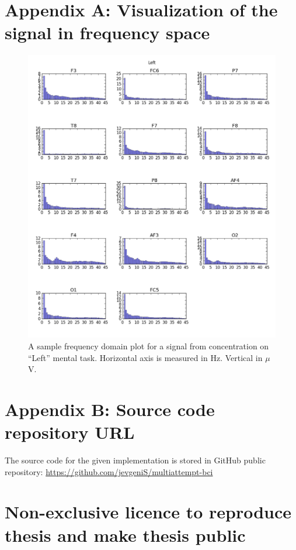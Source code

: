 \documentclass[12pt]{article}
\theoremstyle{definition}
\begin{document}
\section*{Appendix A: Visualization of the signal in frequency space}
\label{app:1}
\begin{figure} [H]
\begin{center}
\includegraphics[width=1\textwidth]{left_amplitudes}
\caption{A sample frequency domain plot for a signal from concentration on ``Left'' mental task. Horizontal axis is measured in Hz. Vertical in $\mu$V.}
\end{center}
\end{figure}

\newpage
\section*{Appendix B: Source code repository URL}
The source code for the given implementation is stored in GitHub public repository:
\url{https://github.com/jevgeniS/multiattempt-bci}

\pagebreak
\section*{\small Non-exclusive licence to reproduce thesis and make thesis public}
\end{document}
